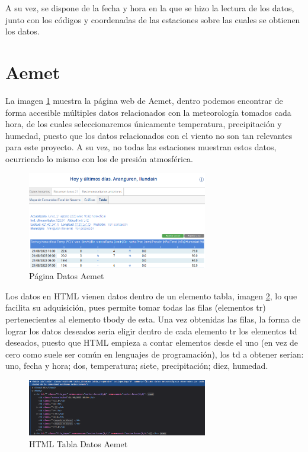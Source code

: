 A su vez, se dispone de la fecha y hora en la que se hizo la lectura de los datos, junto con los códigos y coordenadas de las estaciones sobre las cuales se obtienen los datos.

\section{Aemet}
La imagen \ref{fig:ej3} muestra la página web de Aemet, dentro podemos encontrar de forma accesible múltiples datos relacionados con la meteorología tomados cada hora, de los cuales seleccionaremos únicamente temperatura, precipitación y humedad, puesto que los datos relacionados con el viento no son tan relevantes para este proyecto. A su vez, no todas las estaciones muestran estos datos, ocurriendo lo mismo con los de presión atmosférica.

\begin{figure} [H]
	\centering
	\includegraphics[width=0.7\textwidth]{fig/AemetData.png}
	\caption[Página Aemet de la estación en Aranguren (Navarra)]{Página Datos Aemet}
	\label{fig:ej3}
\end{figure}

Los datos en HTML vienen datos dentro de un elemento tabla, imagen \ref{fig:ej20}, lo que facilita su adquisición, pues permite tomar todas las filas (elementos tr) pertenecientes al elemento tbody de esta. Una vez obtenidas las filas, la forma de lograr los datos deseados seria eligir dentro de cada elemento tr los elementos td deseados, puesto que HTML empieza a contar elementos desde el uno (en vez de cero como suele ser común en lenguajes de programación), los td a obtener serian: uno, fecha y hora; dos, temperatura; siete, precipitación; diez, humedad.

\begin{figure} [H]
	\centering
	\includegraphics[width=0.7\textwidth]{fig/AemetDataHTML.png}
	\caption[HTML de la tabla de datos de Aemet de la estación en Aranguren (Navarra)]{HTML Tabla Datos Aemet}
	\label{fig:ej20}
\end{figure}

